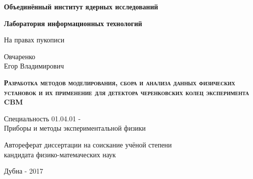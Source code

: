 \begin{titlepage}

\centering

\textbf{
Объединённый институт ядерных исследований
}


\textbf{
Лаборатория информационных технологий
}

\vspace{1cm}

\begin{flushright}
На правах пукописи
\end{flushright}

\vspace{1cm}

Овчаренко \\
Егор Владимирович

\vspace{2cm}

\textbf{
\textsc{
Разработка методов моделирования, сбора и анализа данных
физических установок и их применение для детектора черенковских
колец эксперимента CBM
}
}

\vspace{1cm}

Специальность 01.04.01 - \\
Приборы и методы экспериментальной физики

\vspace{2cm}

Автореферат диссертации на соискание учёной степени \\
кандидата физико-матемаческих наук

\vspace{2cm}

Дубна - 2017

\end{titlepage}
